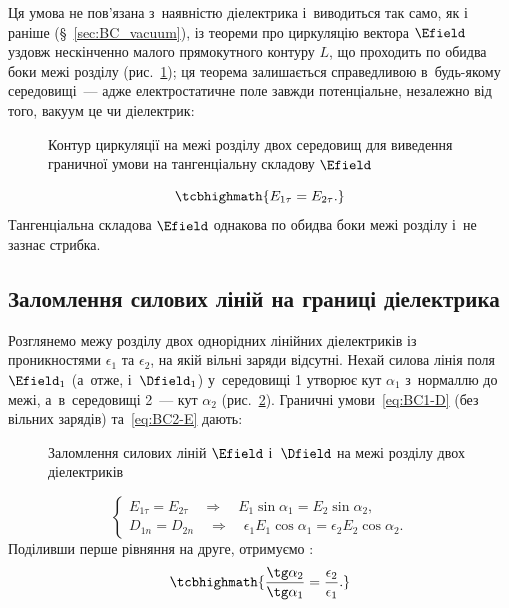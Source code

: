 Ця умова не пов'язана з~наявністю діелектрика і~виводиться так само, як і раніше
(\S~\ref{sec:BC_vacuum}), із теореми про циркуляцію вектора $\Efield$ уздовж нескінченно
малого прямокутного контуру $L$, що проходить по обидва боки межі розділу
(рис.~\ref{pic:BC2}); ця теорема залишається справедливою в~будь-якому середовищі~--- адже
електростатичне поле завжди потенціальне, незалежно від того, вакуум це чи діелектрик:

\begin{figure}\centering
	\caption{Контур циркуляції на межі розділу двох середовищ для виведення граничної
		умови на тангенціальну складову $\Efield$\label{pic:BC2}}
\end{figure}
\begin{equation}\label{eq:BC2-E}
	\tcbhighmath{
		E_{1\tau} = E_{2\tau}.
	}
\end{equation}
Тангенціальна складова $\Efield$ однакова по обидва боки межі розділу і~не зазнає стрибка.


\subsection*{Заломлення силових ліній на границі діелектрика}


Розглянемо межу розділу двох однорідних лінійних діелектриків із проникностями
$\epsilon_1$ та $\epsilon_2$, на якій вільні заряди відсутні. Нехай силова лінія поля
$\Efield_1$ (а~отже, і~$\Dfield_1$) у~середовищі 1 утворює кут $\alpha_1$ з~нормаллю до
межі, а~в~середовищі 2~--- кут $\alpha_2$ (рис.~\ref{pic:RefractionE}). Граничні
умови~\eqref{eq:BC1-D} (без вільних зарядів) та~\eqref{eq:BC2-E} дають:

\begin{figure}[h!]\centering
	\caption{Заломлення силових ліній $\Efield$ і~$\Dfield$ на межі розділу двох
		діелектриків\label{pic:RefractionE}}
\end{figure}
\begin{equation*}
	\begin{cases}
		E_{1\tau} = E_{2\tau} \quad\Longrightarrow\quad E_1\sin\alpha_1 = E_2\sin\alpha_2, \\
		D_{1n} = D_{2n} \quad\Longrightarrow\quad \epsilon_1 E_1\cos\alpha_1 = \epsilon_2 E_2\cos\alpha_2.
	\end{cases}
\end{equation*}
Поділивши перше рівняння на друге, отримуємо :
\begin{equation}\label{eq:RefractionE}
	\tcbhighmath{
		\frac{\tg\alpha_2}{\tg\alpha_1} = \frac{\epsilon_2}{\epsilon_1}.
	}
\end{equation}

